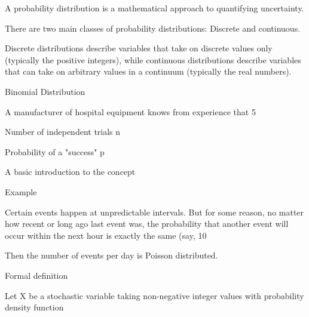 \documentclass[12pt]{report}
\begin{document}
A probability distribution is a mathematical approach to quantifying uncertainty.

There are two main classes of probability distributions: Discrete and continuous. 

Discrete distributions describe variables that take on discrete values only (typically the positive integers), while continuous 
distributions describe variables that can take on arbitrary values in a continuum (typically the real numbers).














Binomial Distribution

A manufacturer of hospital equipment knows from experience that 5%

Number of independent trials    n

Probability of a "success" p













A basic introduction to the concept

Example

Certain events happen at unpredictable intervals. But for some reason, no matter how recent or long ago last event was, the probability that another event will occur within the next hour is exactly the same (say, 10%

Then the number of events per day is Poisson distributed.

Formal definition

Let X be a stochastic variable taking non-negative integer values with probability density function
\end{document}
